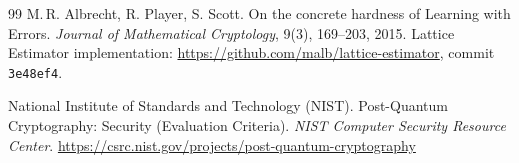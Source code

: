 \begin{thebibliography}{99}
 M.\,R. Albrecht, R. Player, S. Scott. On the concrete hardness of Learning with Errors. \emph{Journal of Mathematical Cryptology}, 9(3), 169--203, 2015. Lattice Estimator implementation: \url{https://github.com/malb/lattice-estimator}, commit \texttt{3e48ef4}.

 National Institute of Standards and Technology (NIST). Post-Quantum Cryptography: Security (Evaluation Criteria). \emph{NIST Computer Security Resource Center}. \url{https://csrc.nist.gov/projects/post-quantum-cryptography}

\end{thebibliography}
